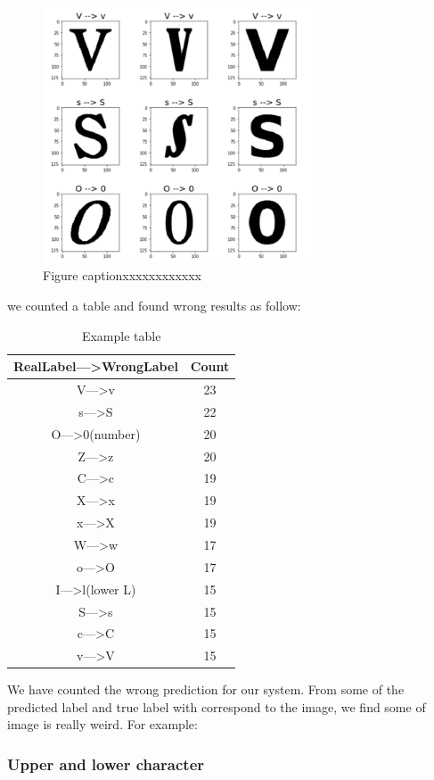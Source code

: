 \documentclass[twoside,twocolumn]{article}
\begin{document}
\begin{figure}[h]
\includegraphics[width=8cm]{wront_pic_ana.png}
\centering
\caption{Figure captionxxxxxxxxxxxx}\label{fig3}
\end{figure}

we counted a table and found wrong results as follow:

\begin{table}[h]
\caption{Example table}
\centering
\begin{tabular}{c|c}
\hline
RealLabel—>WrongLabel & Count\\
\hline
V—>v & 23 \\
s—>S & 22 \\
O—>0(number) & 20 \\
Z—>z & 20 \\
C—>c & 19 \\
X—>x & 19 \\
x—>X & 19 \\
W—>w & 17 \\
o—>O & 17 \\
I—>l(lower L) & 15 \\
S—>s & 15 \\
c—>C & 15 \\
v—>V & 15 \\
\hline
\end{tabular}
\end{table}

We have counted the wrong prediction for our system. From some of the predicted label and true label with correspond to the image, we find some of image is really weird. For example:

\subsubsection{Upper and lower character}
\end{document}
